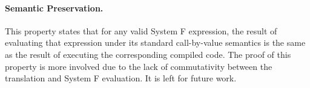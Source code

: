 \paragraph{Semantic Preservation.} This property states that for any valid System F 
expression, the result of evaluating that expression under its standard call-by-value semantics
is the same as the result of executing the corresponding compiled code. The proof of this
property is more involved due to the lack of commutativity between the translation
and System F evaluation. It is left for future work.


